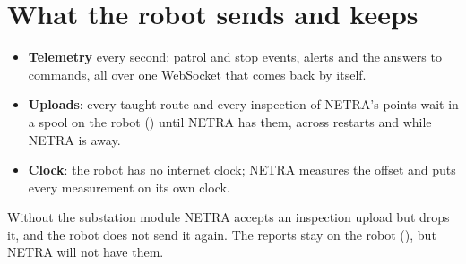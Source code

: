 \section{What the robot sends and keeps}

\begin{itemize}
  \item \textbf{Telemetry} every second; patrol and stop events, alerts and the answers to
    commands, all over one WebSocket that comes back by itself.
  \item \textbf{Uploads}: every taught route and every inspection of NETRA's points wait in a
    spool on the robot () until NETRA has them, across restarts and while NETRA
    is away.
  \item \textbf{Clock}: the robot has no internet clock; NETRA measures the offset and puts every
    measurement on its own clock.
\end{itemize}

\begin{warnbox}
Without the substation module NETRA accepts an inspection upload but drops it, and the robot
does not send it again. The reports stay on the robot (), but NETRA will
not have them.
\end{warnbox}
